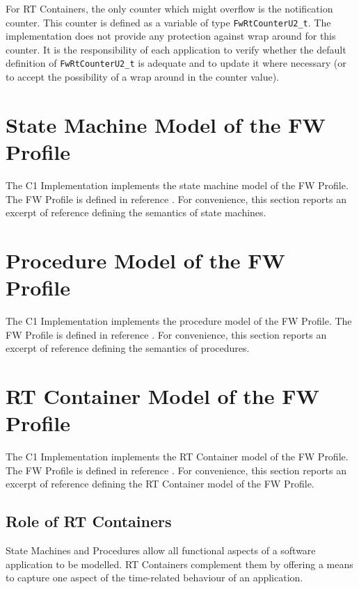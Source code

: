 \documentclass[manual]{../fwprofile}
\begin{document}
For RT Containers, the only counter which might overflow is the notification counter. This counter is defined as a variable of type \texttt{FwRtCounterU2\_t}. The implementation does not provide any protection against wrap around for this counter. It is the responsibility of each application to verify whether the default definition of \texttt{FwRtCounterU2\_t} is adequate and to update it where necessary (or to accept the possibility of a wrap around in the counter value).

\appendix
\section{State Machine Model of the FW Profile}\label{sec:smModel}
The C1 Implementation implements the state machine model of the FW Profile. The FW Profile is defined in reference \cite{ref:fwprofile}. For convenience, this section reports an excerpt of reference \cite{ref:fwprofile} defining the semantics of state machines.




\section{Procedure Model of the FW Profile}\label{sec:prModel}
The C1 Implementation implements the procedure model of the FW Profile. The FW Profile is defined in reference \cite{ref:fwprofile}. For convenience, this section reports an excerpt of reference \cite{ref:fwprofile} defining the semantics of procedures.




\section{RT Container Model of the FW Profile}\label{sec:rtContainerModel}
The C1 Implementation implements the RT Container model of the FW Profile. The FW Profile is defined in reference \cite{ref:fwprofile}. For convenience, this section reports an excerpt of reference \cite{ref:fwprofile} defining the RT Container model of the FW Profile.

\subsection{Role of RT Containers}
State Machines and Procedures allow all functional aspects of a software application to be modelled. RT Containers complement them by offering a means to capture one aspect of the time-related behaviour of an application.
\end{document}
